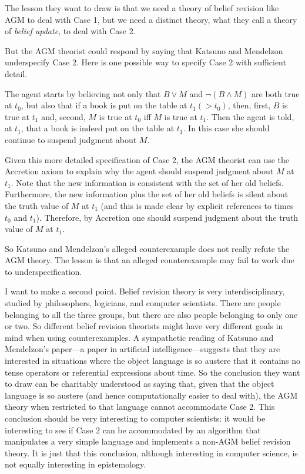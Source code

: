 The lesson they want to draw is that we need a theory of belief revision like AGM to deal with Case 1, but we need a distinct theory, what they call a theory of {\em belief update}, to deal with Case 2. 

But the AGM theorist could respond by saying that Katsuno and Mendelzon underspecify Case 2. Here is one possible way to specify Case 2 with sufficient detail. \op

	 The agent starts by believing not only that $B \vee M$ and $\neg(B \wedge M)$ are both true at $t_0$, but also that if a book is put on the table at $t_1 (> t_0)$, then, first, $B$ is true at $t_1$ and, second, $M$ is true at $t_0$ iff $M$ is true at $t_1$. Then the agent is told, at $t_1$, that a book is indeed put on the table at $t_1$. In this case she should continue to suspend judgment about $M$. 

\ed Given this more detailed specification of Case 2, the AGM theorist can use the Accretion axiom to explain why the agent should suspend judgment about $M$ at $t_1$. Note that the new information is consistent with the set of her old beliefs. Furthermore, the new information plus the set of her old beliefs is silent about the truth value of $M$ at $t_1$ (and this is made clear by explicit references to times $t_0$ and $t_1$). Therefore, by Accretion one should suspend judgment about the truth value of $M$ at $t_1$. 

So Katsuno and Mendelzon's alleged counterexample does not really refute the AGM theory. The lesson is that an alleged counterexample may fail to work due to underspecification. 

I want to make a second point. Belief revision theory is very interdisciplinary, studied by philosophers, logicians, and computer scientists. There are people belonging to all the three groups, but there are also people belonging to only one or two. So different belief revision theorists might have very different goals in mind when using counterexamples. A sympathetic reading of Katsuno and Mendelzon's paper---a paper in artificial intelligence---suggests that they are interested in situations where the object language is so austere that it contains no tense operators or referential expressions about time. So the conclusion they want to draw can be charitably understood as saying that, given that the object language is so austere (and hence computationally easier to deal with), the AGM theory when restricted to that language cannot accommodate Case 2.  This conclusion should be very interesting to computer scientists: it would be interesting to see if Case 2 can be accommodated by an algorithm that manipulates a very simple language and implements a non-AGM belief revision theory. It is just that this conclusion, although interesting in computer science, is not equally interesting in epistemology.


